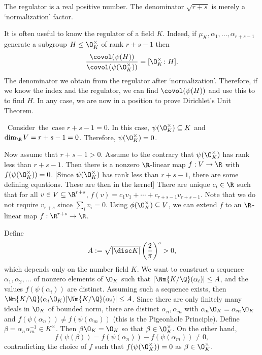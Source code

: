 \begin{rem}
The regulator is a real positive number. The denominator $\sqrt{r+s}$ is merely a `normalization' factor. 
\end{rem}

It is often useful to know the regulator of a field $K$. Indeed, if $\mu_K, \alpha_1,\ldots,\alpha_{r+s-1}$ generate a subgroup $H \leq \O_K^\times$ of rank $r+s-1$ then
	\[
	\dfrac{\covol(\psi(H))}{\covol(\psi(\O_K^\times))}= [\O_K^\times \colon H].
	\]
The denominator we obtain from the regulator after `normalization'. Therefore, if we know the index and the regulator, we can find $\covol(\psi(H))$ and use this to to find $H$. In any case, we are now in a position to prove Dirichlet's Unit Theorem.


\unit*

\pf Consider the case $r+s-1=0$. In this case, $\psi(\O_K^\times) \subseteq K$ and $\dim_\R V=r+s-1=0$. Therefore, $\psi(\O_K^\times)=0$. 

Now assume that $r+s-1>0$. Assume to the contrary that $\psi(\O_K^\times)$ has rank less than $r+s-1$. Then there is a nonzero $\R$-linear map $f: V \to \R$ with $f(\psi(\O_K^\times))=0$. [Since $\psi(\O_K^\times)$ has rank less than $r+s-1$, there are some defining equations. These are then in the kernel] There are unique $c_i \in \R$ such that for all $v \in V \subseteq \R^{r+s}$, $f(v)= c_1v_1+\cdots+c_{r+s-1} v_{r+s-1}$. Note that we do not require $v_{r+s}$ since $\sum_i v_i=0$. Using $\phi(\O_K^\times) \subseteq V$, we can extend $f$ to an $\R$-linear map $f: \R^{r+s} \to \R$. 


Define 
	\[
	A:= \sqrt{|\disc K|} \left(\dfrac{2}{\pi}\right)^s>0,
	\]
which depends only on the number field $K$. We want to construct a sequence $\alpha_1,\alpha_2,\ldots$ of nonzero elements of $\O_K$ such that $|\Nm{K/\Q}(\alpha_i)| \leq A$, and the values $f(\psi(\alpha_i))$ are distinct. Assuming such a sequence exists, then $\Nm{K/\Q}(\alpha_i \O_K) |\Nm{K/\Q}(\alpha_i)| \leq A$. Since there are only finitely many ideals in $\O_K$ of bounded norm, there are distinct $\alpha_n,\alpha_m$ with $\alpha_n \O_K= \alpha_m \O_K$ and $f(\psi(\alpha_n)) \neq f(\psi(\alpha_m))$ (this is the Pigeonhole Principle). Define $\beta= \alpha_n\alpha_m^{-1} \in K^\times$. Then $\beta \O_K=\O_K$ so that $\beta \in \O_K^\times$. On the other hand,
	\[
	f(\psi(\beta))= f(\psi(\alpha_n)) - f(\psi(\alpha_m)) \neq 0,
	\]
contradicting the choice of $f$ such that $f(\psi(\O_K^\times))=0$ as $\beta \in \O_K^\times$.

